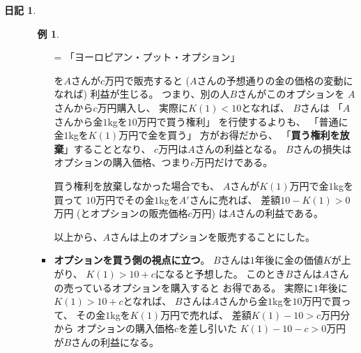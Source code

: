\documentclass[uplatex]{jsarticle}
\theoremstyle{definition}
\newtheorem*{exam*}{例}
\newtheorem*{nikki*}{日記}
\begin{document}
\begin{nikki*}
\begin{itemize}
\begin{itemize}
\begin{framed}
\begin{exam*}
\begin{itemize}
\begin{center}
              = 「ヨーロピアン・プット・オプション」
            \end{center}
            を\(A\)さんが\(c\)万円で販売すると
             (\(A\)さんの予想通りの金の価格の変動になれば)
            利益が生じる。
            つまり、別の人\(B\)さんがこのオプションを
            \(A\)さんから\(c\)万円購入し、
            実際に\(K(1)<10\)となれば、
            \(B\)さんは
            「\(A\)さんから金\(1\)kgを\(10\)万円で買う権利」
            を行使するよりも、
            「普通に金\(1\)kgを\(K(1)\)万円で金を買う」
            方がお得だから、
            「\textbf{買う権利を放棄}」することとなり、
            \(c\)万円は\(A\)さんの利益となる。
            \(B\)さんの損失はオプションの購入価格、つまり\(c\)万円だけである。

            買う権利を放棄しなかった場合でも、
            \(A\)さんが\(K(1)\)万円で金\(1\)kgを買って
            \(10\)万円でその金\(1\)kgを\(A'\)さんに売れば、
            差額\(10-K(1) > 0\)万円
            (とオプションの販売価格\(c\)万円)
            は\(A\)さんの利益である。

            以上から、\(A\)さんは上のオプションを販売することにした。
            \item
            \textbf{オプションを買う側の視点に立つ}。
            \(B\)さんは\(1\)年後に金の価値\(K\)が上がり、
            \(K(1) > 10 + c\)になると予想した。
            このとき\(B\)さんは\(A\)さんの売っているオプションを購入すると
            お得である。
            実際に\(1\)年後に\(K(1) > 10 + c\)となれば、
            \(B\)さんは\(A\)さんから金\(1\)kgを\(10\)万円で買って、
            その金\(1\)kgを\(K(1)\)万円で売れば、
            差額\(K(1) - 10 > c\)万円分から
            オプションの購入価格\(c\)を差し引いた
            \(K(1) - 10 - c > 0\)万円が\(B\)さんの利益になる。


\end{itemize}
\end{exam*}
\end{framed}
\end{itemize}
\end{itemize}
\end{nikki*}
\end{document}
